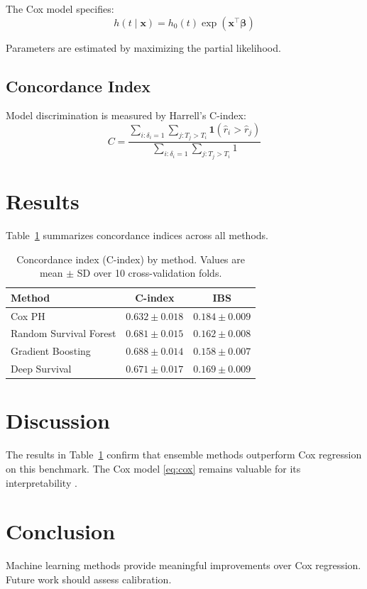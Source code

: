 \documentclass[preprint, 12pt, authoryear]{elsarticle}
\begin{document}
The Cox model specifies:
\begin{equation}
  h(t \mid \mathbf{x})
    = h_0(t) \exp(\mathbf{x}^\top \boldsymbol{\beta})
  \label{eq:cox}
\end{equation}

Parameters are estimated by maximizing the partial likelihood.

\subsection{Concordance Index}

Model discrimination is measured by Harrell's C-index:
\begin{equation}
  C = \frac{\sum_{i:\delta_i=1}
            \sum_{j: T_j > T_i}
            \mathbf{1}(\hat{r}_i > \hat{r}_j)}
           {\sum_{i:\delta_i=1}
            \sum_{j: T_j > T_i} 1}
\end{equation}

\section{Results}
\label{sec:results}

Table~\ref{tab:results} summarizes concordance indices
across all methods.

\begin{table}[htbp]
  \centering
  \caption{Concordance index (C-index) by method.
           Values are mean $\pm$ SD over 10 cross-validation folds.}
  \label{tab:results}
  \begin{tabular}{lcc}
    \toprule
    Method            & C-index         & IBS             \\
    \midrule
    Cox PH            & $0.632 \pm 0.018$ & $0.184 \pm 0.009$ \\
    Random Survival Forest & $0.681 \pm 0.015$ & $0.162 \pm 0.008$ \\
    Gradient Boosting & $0.688 \pm 0.014$ & $0.158 \pm 0.007$ \\
    Deep Survival     & $0.671 \pm 0.017$ & $0.169 \pm 0.009$ \\
    \bottomrule
  \end{tabular}
\end{table}

\section{Discussion}
\label{sec:discussion}

The results in Table~\ref{tab:results} confirm that ensemble
methods outperform Cox regression on this benchmark.
The Cox model \eqref{eq:cox} remains valuable for its
interpretability \citep{hastie2009}.

\section{Conclusion}

Machine learning methods provide meaningful improvements
over Cox regression. Future work should assess calibration.



\end{document}
